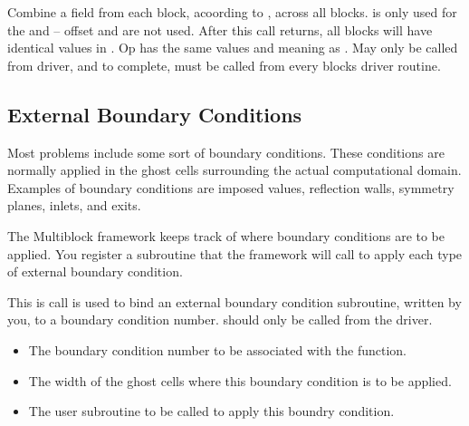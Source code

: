 \documentclass[10pt]{article}
\begin{document}
\vspace{0.2in}
     Combine a field from each block, acoording to , across all blocks.
 is only used for the  and -- offset and
 are not used.  After this call returns, all blocks will have
identical values in .  Op has the same values and meaning as
.
     May only be called from driver, and to complete, must be called
     from every blocks driver routine.

\vspace{0.2in}

\subsection{External Boundary Conditions}

Most problems include some sort of boundary conditions.  These conditions
are normally applied in the ghost cells surrounding the actual computational domain.
Examples of boundary conditions are imposed values, reflection walls, symmetry planes,
inlets, and exits.

The Multiblock framework keeps track of where boundary conditions are to be applied.
You register a subroutine that the framework will call to apply each type of 
external boundary condition.

\vspace{0.2in}
This is call is used to bind an external boundary condition subroutine,
written by you, to a boundary condition number.
 should only be called from the driver.

\begin{itemize}
	\item {} The boundary condition number to be associated with the 
	function.
	\item {} The width of the ghost cells where this boundary
	condition is to be applied.
	\item {} The user subroutine to be called to apply this
	boundry condition.
\end{itemize}
\end{document}
